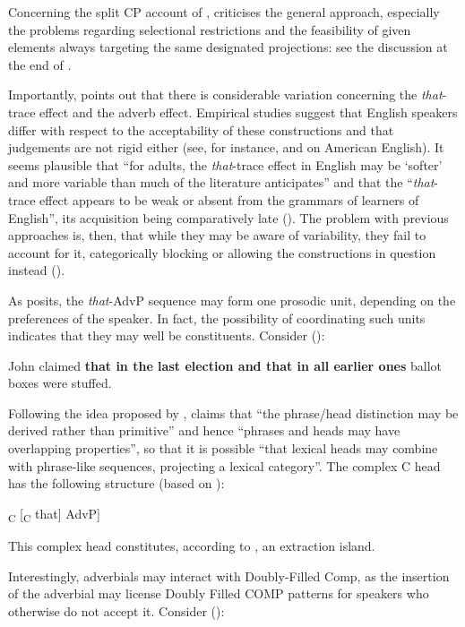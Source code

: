 Concerning the split CP account of \citet{rizzi1997}, \citet[534--536]{sobin2002} criticises the general approach, especially the problems regarding selectional restrictions and the feasibility of given elements always targeting the same designated projections: see the discussion at the end of .

Importantly, \citet[536--537]{sobin2002} points out that there is considerable variation concerning the \textit{that}-trace effect and the adverb effect. Empirical studies suggest that English speakers differ with respect to the acceptability of these constructions and that judgements are not rigid either (see, for instance, \citealt[328]{pesetsky1982} and \citealt{sobin1987} on American English). It seems plausible that ``for adults, the \textit{that}-trace effect in English may be `softer' and more variable than much of the literature anticipates'' and that the ``\textit{that}-trace effect appears to be weak or absent from the grammars of learners of English'', its acquisition being comparatively late (\citealt[537]{sobin2002}). The problem with previous approaches is, then, that while they may be aware of variability, they fail to account for it, categorically blocking or allowing the constructions in question instead (\citealt[537]{sobin2002}).

As \citet[537]{sobin2002} posits, the \textit{that}-AdvP sequence may form one prosodic unit, depending on the preferences of the speaker. In fact, the possibility of coordinating such units indicates that they may well be constituents. Consider (\citealt[538, ex. 21a]{sobin2002}):

\ea John claimed \textbf{that in the last election and that in all earlier ones} ballot boxes were stuffed.
\z

Following the idea proposed by \citet{carnie2000}, \citet[538]{sobin2002} claims that ``the phrase/head distinction may be derived rather than primitive'' and hence ``phrases and heads may have overlapping properties'', so that it is possible ``that lexical heads may combine with phrase-like sequences, projecting a lexical category''. The complex C head has the following structure (based on \citealt[539, ex. 22]{sobin2002}):

\ea {[}\textsubscript{C} [\textsubscript{C} that] AdvP]
\z

This complex head constitutes, according to \citet{carnie2000}, an extraction island.

Interestingly, adverbials may interact with Doubly-Filled Comp, as the insertion of the adverbial may license Doubly Filled COMP patterns for speakers who otherwise do not accept it. Consider (\citealt[539--540, ex. 25a and 25e]{sobin2002}):

